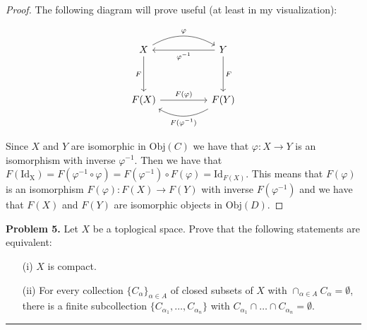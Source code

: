 \documentclass[leqno]{article}
\theoremstyle{nonumberplain}
\newtheorem{proof}{Proof}
\begin{document}
\begin{proof}
The following diagram will prove useful (at least in my visualization):
\begin{center}
\[
\begin{tikzcd}
X \arrow[dd, "F"'] \arrow[rr, "\varphi", bend left] &  & Y \arrow[dd, "F"] \arrow[ll, "\varphi^{-1}"] \\
 &  &  \\
F(X) \arrow[rr, "F(\varphi)"] &  & F(Y) \arrow[ll, "F(\varphi^{-1})", bend left]
\end{tikzcd}
\]
\end{center}

Since $X$ and $Y$ are isomorphic in $\mathrm{Obj}(C)$ we have that $\varphi \colon X \to Y$ is an isomorphism with inverse $\varphi^{-1}$.  Then we have that $F(\mathrm{Id_X}) = F(\varphi^{-1} \circ \varphi) = F(\varphi^{-1}) \circ F(\varphi) = \mathrm{Id}_{F(X)}$.  This means that $F(\varphi)$ is an isomorphism $F(\varphi) \colon F(X) \to F(Y)$ with inverse $F(\varphi^{-1})$ and we have that $F(X)$ and $F(Y)$ are isomorphic objects in $\mathrm{Obj}(D)$.
\end{proof}


\pagebreak




\noindent\textbf{Problem 5.} Let $X$ be a toplogical space. Prove that the following statements are equivalent:
\begin{enumerate}
\item[(i)] $X$ is compact.
\item[(ii)] For every collection $\{C_\alpha\}_{\alpha\in A}$ of closed subsets of $X$ with $\cap_{\alpha\in A} C_\alpha=\emptyset$, there is a finite subcollection $\{C_{\alpha_1},\ldots,C_{\alpha_n}\}$ with $C_{\alpha_1}\cap\ldots\cap C_{\alpha_n}=\emptyset$.
\end{enumerate}

\noindent\rule[0.5ex]{\linewidth}{1pt}
\end{document}
